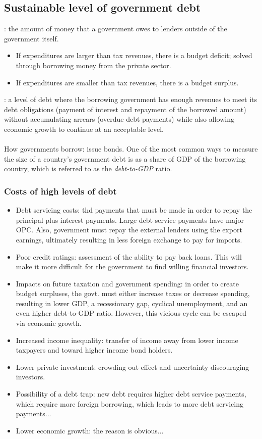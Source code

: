 \subsection{Sustainable level of government debt}
: the amount of money that a government owes to lenders outside of the government itself.
\begin{itemize}
  \item If expenditures are larger than tax revenues, there is a budget deficit; solved through borrowing money from the private sector.
  \item If expenditures are smaller than tax revenues, there is a budget surplus.
\end{itemize}
: a level of debt where the borrowing government has enough revenues to meet its debt obligations (payment of interest and repayment of the borrowed amount) without accumulating arrears (overdue debt payments) while also allowing economic growth to continue at an acceptable level.
\\\\How governments borrow: issue bonds. One of the most common ways to measure the size of a country's government debt is as a share of GDP of the borrowing country, which is referred to as the \emph{debt-to-GDP} ratio.
\subsubsection*{Costs of high levels of debt}
\begin{itemize}
  \item Debt servicing costs: thd payments that must be made in order to repay the principal plus interest payments. Large debt service payments have major OPC. Also, government must repay the external lenders using the export earnings, ultimately resulting in less foreign exchange to pay for imports.
  \item Poor credit ratings: assessment of the ability to pay back loans. This will make it more difficult for the government to find willing financial investors.
  \item Impacts on future taxation and government spending: in order to create budget surpluses, the govt. must either increase taxes or decrease spending, resulting in lower GDP, a recessionary gap, cyclical unemployment, and an even higher debt-to-GDP ratio. However, this vicious cycle can be escaped via economic growth.
  \item Increased income inequality: transfer of income away from lower income taxpayers and toward higher income bond holders.
  \item Lower private investment: crowding out effect and uncertainty discouraging investors.
  \item Possibility of a debt trap: new debt requires higher debt service payments, which require more foreign borrowing, which leads to more debt servicing payments...
  \item Lower economic growth: the reason is obvious...
\end{itemize}
